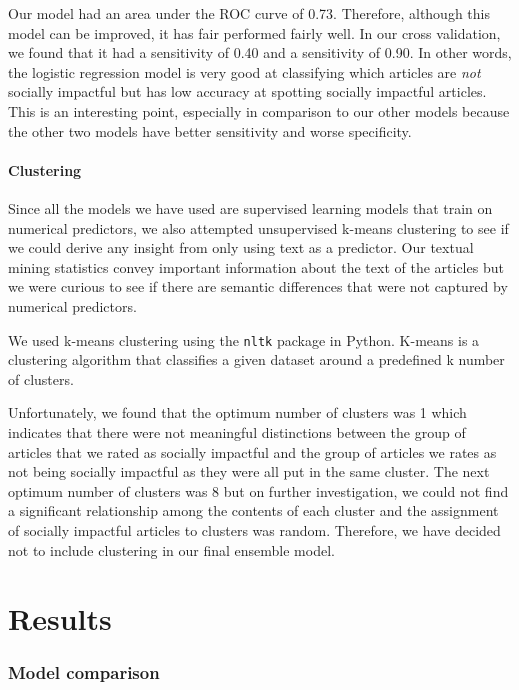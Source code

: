\documentclass[10pt,letterpaper]{article}
\begin{document}
Our model had an area under the ROC curve of 0.73. Therefore, although
this model can be improved, it has fair performed fairly well. In our
cross validation, we found that it had a sensitivity of 0.40 and a
sensitivity of 0.90. In other words, the logistic regression model is
very good at classifying which articles are \emph{not} socially
impactful but has low accuracy at spotting socially impactful articles.
This is an interesting point, especially in comparison to our other
models because the other two models have better sensitivity and worse
specificity.

\hypertarget{clustering}{%
\paragraph{Clustering}\label{clustering}}

Since all the models we have used are supervised learning models that
train on numerical predictors, we also attempted unsupervised k-means
clustering to see if we could derive any insight from only using text as
a predictor. Our textual mining statistics convey important information
about the text of the articles but we were curious to see if there are
semantic differences that were not captured by numerical predictors.

We used k-means clustering using the \texttt{nltk} package in Python.
K-means is a clustering algorithm that classifies a given dataset around
a predefined k number of clusters.

Unfortunately, we found that the optimum number of clusters was 1 which
indicates that there were not meaningful distinctions between the group
of articles that we rated as socially impactful and the group of
articles we rates as not being socially impactful as they were all put
in the same cluster. The next optimum number of clusters was 8 but on
further investigation, we could not find a significant relationship
among the contents of each cluster and the assignment of socially
impactful articles to clusters was random. Therefore, we have decided
not to include clustering in our final ensemble model.

\hypertarget{results}{%
\section{Results}\label{results}}

\hypertarget{model-comparison}{%
\subsubsection{Model comparison}\label{model-comparison}}
\end{document}
